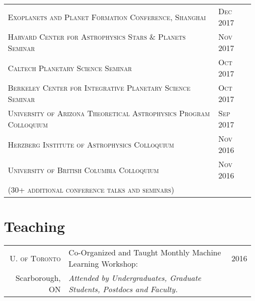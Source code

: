 \documentclass[10pt]{article} %
\begin{document}
{\begin{tabular}{l>{\hfill}p{3.0cm}}
\textsc{Exoplanets and Planet Formation Conference, Shanghai} & \textsc{Dec} 2017 \\
\textsc{Harvard Center for Astrophysics Stars \& Planets Seminar} & \textsc{Nov} 2017 \\
\textsc{Caltech Planetary Science Seminar} & \textsc{Oct} 2017 \\
\textsc{Berkeley Center for Integrative Planetary Science Seminar} & \textsc{Oct} 2017 \\
\textsc{University of Arizona Theoretical Astrophysics Program Colloquium} & \textsc{Sep} 2017 \\
\textsc{Herzberg Institute of Astrophysics Colloquium} & \textsc{Nov} 2016 \\
\textsc{University of British Columbia Colloquium} & \textsc{Nov} 2016 \\
\textsc{(30+ additional conference talks and seminars)}
\end{tabular}


\section{Teaching}

\begin{tabular}{>{\hfill}r|p{11.2cm}r}


\textsc{U. of Toronto} & Co-Organized and Taught Monthly Machine Learning Workshop: & 2016 \\
Scarborough, ON & \hspace{0.25cm} {\it Attended by Undergraduates, Graduate Students, Postdocs and Faculty.} \\


\end{tabular}}
\end{document}
